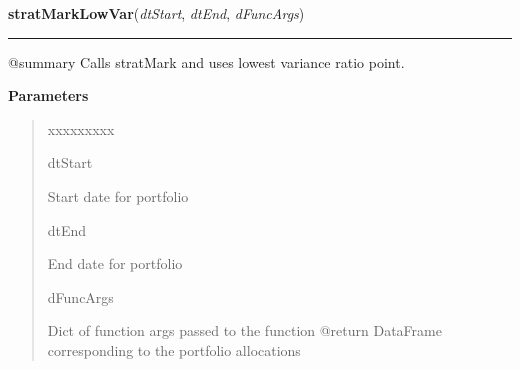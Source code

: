 \hspace{.8\funcindent}\begin{boxedminipage}{\funcwidth}

    \raggedright \textbf{stratMarkLowVar}(\textit{dtStart}, \textit{dtEnd}, \textit{dFuncArgs})

    \vspace{-1.5ex}

    \rule{\textwidth}{0.5\fboxrule}
\setlength{\parskip}{2ex}
    @summary Calls stratMark and uses lowest variance ratio point.

\setlength{\parskip}{1ex}
      \textbf{Parameters}
      \vspace{-1ex}

      \begin{quote}
        \begin{Ventry}{xxxxxxxxx}

          \item[dtStart]

          Start date for portfolio

          \item[dtEnd]

          End date for portfolio

          \item[dFuncArgs]

          Dict of function args passed to the function @return DataFrame 
          corresponding to the portfolio allocations

        \end{Ventry}

      \end{quote}

    \end{boxedminipage}

    \label{QSTK:qstkstrat:strategies:stratMarkMaxRet}

    \vspace{0.5ex}

